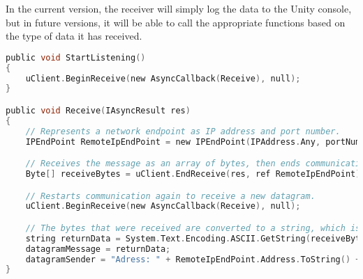In the current version, the receiver will simply log the data to the Unity console, but in future versions, it will be able to call the appropriate functions based on the type of data it has received.

\begin{lstlisting}[caption={Receiving data from host},language=C,label={lst:receivedata}]
public void StartListening()
{
    uClient.BeginReceive(new AsyncCallback(Receive), null);
}

public void Receive(IAsyncResult res)
{
    // Represents a network endpoint as IP address and port number.
    IPEndPoint RemoteIpEndPoint = new IPEndPoint(IPAddress.Any, portNumber);

    // Receives the message as an array of bytes, then ends communication with the remote endpoint.
    Byte[] receiveBytes = uClient.EndReceive(res, ref RemoteIpEndPoint);

    // Restarts communication again to receive a new datagram.
    uClient.BeginReceive(new AsyncCallback(Receive), null);

    // The bytes that were received are converted to a string, which is written to the unity debug log.
    string returnData = System.Text.Encoding.ASCII.GetString(receiveBytes);
    datagramMessage = returnData;
    datagramSender = "Adress: " + RemoteIpEndPoint.Address.ToString() + ", port: " + RemoteIpEndPoint.Port.ToString();
}
\end{lstlisting}